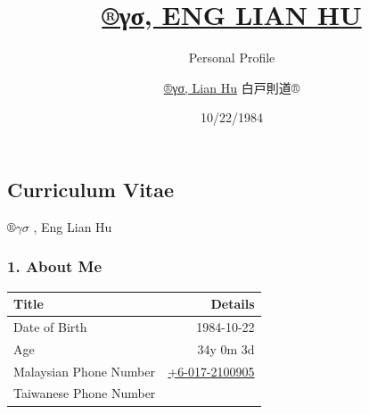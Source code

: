 \documentclass[]{article}
\title{\href{https://beta.rstudioconnect.com/content/3091/ryo-eng.html}{®γσ,
ENG LIAN HU}}
\subtitle{Personal Profile}
\author{\href{https://englianhu.github.io/}{®γσ, Lian Hu} 白戸則道®}
\date{10/22/1984}
\begin{document}
\maketitle

{
\setcounter{tocdepth}{2}
\tableofcontents
}
\subsection{Curriculum Vitae}\label{curriculum-vitae}

\(®γσ\) , Eng Lian Hu

\subsubsection{1. About Me}\label{about-me}

\begin{longtable}[]{@{}lr@{}}
\toprule
\begin{minipage}[b]{0.21\columnwidth}\raggedright\strut
\textbf{Title}\strut
\end{minipage} & \begin{minipage}[b]{0.73\columnwidth}\raggedleft\strut
\textbf{Details}\strut
\end{minipage}\tabularnewline
\midrule
\endhead
\begin{minipage}[t]{0.21\columnwidth}\raggedright\strut
Date of Birth\strut
\end{minipage} & \begin{minipage}[t]{0.73\columnwidth}\raggedleft\strut
1984-10-22\strut
\end{minipage}\tabularnewline
\begin{minipage}[t]{0.21\columnwidth}\raggedright\strut
Age\strut
\end{minipage} & \begin{minipage}[t]{0.73\columnwidth}\raggedleft\strut
34y 0m 3d\strut
\end{minipage}\tabularnewline
\begin{minipage}[t]{0.21\columnwidth}\raggedright\strut
Malaysian Phone Number\strut
\end{minipage} & \begin{minipage}[t]{0.73\columnwidth}\raggedleft\strut
\href{tel:+60172100905}{+6-017-2100905}\strut
\end{minipage}\tabularnewline
\begin{minipage}[t]{0.21\columnwidth}\raggedright\strut
Taiwanese Phone Number\strut
\end{minipage} & \begin{minipage}[t]{0.73\columnwidth}\raggedleft\strut

\end{minipage}
\end{longtable}
\end{document}
